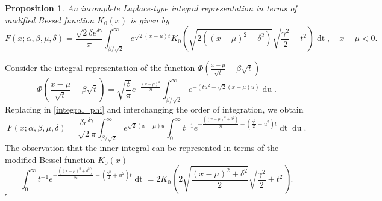 \documentclass[10pt,a4paper,oneside]{article}
\newtheorem{proposition}[theorem]{Proposition}
\newenvironment{proof}{\noindent{\bf Proof:}}{\hfill$\square$}
\numberwithin{equation}{section}
\begin{document}
\begin{proposition} An incomplete Laplace-type integral representation in terms of modified Bessel function $K_0(x)$ is given by
\begin{equation}\label{integral_k0}
F(x; \alpha, \beta, \mu, \delta) = \frac{\sqrt{2}\delta e^{\delta \gamma}}{\pi}\int_{\beta / \sqrt{2}}^{\infty} e^{\sqrt{2}(x-\mu)t} K_0\left(\sqrt{2\left( (x-\mu)^2 + \delta^2\right)} \sqrt{\frac{\gamma^2}{2} + t^2}\right) \mathop{dt}, \quad x - \mu < 0.
\end{equation}
\end{proposition}
\begin{proof}
Consider the integral representation of the function $\Phi\left(\frac{x-\mu}{\sqrt{t}} -\beta \sqrt{t} \right)$
\begin{equation*}
\Phi\left(\frac{x-\mu}{\sqrt{t}} -\beta \sqrt{t} \right) = \sqrt{\frac{t}{\pi}} e^{-\frac{(x-\mu)^2}{2t}}\int_{\beta/\sqrt{2}}^{\infty} e^{-(tu^2 - \sqrt{2}(x-\mu) u)} \mathop{du}.
\end{equation*}
Replacing in \eqref{integral_phi} and interchanging the order of integration, we obtain
\begin{equation*}
F(x; \alpha, \beta, \mu, \delta) = \frac{\delta e^{\delta \gamma}}{\sqrt{2}\pi} \int_{\beta/\sqrt{2}}^{\infty} e^{\sqrt{2}(x-\mu) u} \int_{0}^{\infty} t^{-1} e^{-\frac{\left((x-\mu)^2 + \delta^2\right)}{2t} - \left(\frac{\gamma^2}{2} + u^2\right)t} \mathop{dt} \mathop{du}.
\end{equation*}
The observation that the inner integral can be represented in terms of the modified Bessel function $K_0(x)$
\begin{equation*}
\int_{0}^{\infty} t^{-1} e^{-\frac{\left((x-\mu)^2 + \delta^2\right)}{2t} - \left(\frac{\gamma^2}{2} + u^2\right)t} \mathop{dt} = 2 K_0\left(2\sqrt{\frac{(x-\mu)^2 + \delta^2}{2}} \sqrt{\frac{\gamma^2}{2} + t^2}\right).
\end{equation*}
\end{proof}
\end{document}
